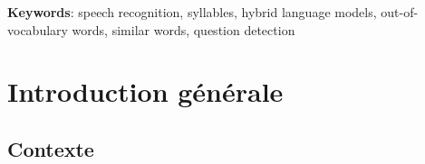 \documentclass{style/these}
\makeatletter
\newcommand\blankpage{%
    \null
    \thispagestyle{empty}%
    \addtocounter{page}{-1}%
    \newpage}
\renewcommand*{\cleardoublepage}{\clearpage\if@twoside \ifodd\c@page\else
	\hbox{}%
	\thispagestyle{empty}%
	\newpage%
	\if@twocolumn\hbox{}\newpage\fi\fi\fi}
\makeatother
\begin{document}
{\vspace{1.5ex}

\noindent\textbf{Keywords}: speech recognition, syllables, hybrid language models, out-of-vocabulary words, similar words, question detection
}

\cleardoublepage

\dominitoc
\doparttoc

\tableofcontents



\cleardoublepage
\begingroup
\makeatletter
\let\ps@plain\ps@empty
\makeatother

\pagestyle{empty}
{\small \listoffigures}
\cleardoublepage
\endgroup

\cleardoublepage
\begingroup
\makeatletter
\let\ps@plain\ps@empty
\makeatother

\pagestyle{empty}
{\small \listoftables}
\cleardoublepage
\endgroup



\mainmatter

\pagestyle{fancy}




{}

\chapter*{Introduction générale}
\renewcommand{\leftmark}{Introduction générale}

\minitoc

\section*{Contexte}
\renewcommand{\rightmark}{Contexte}
\end{document}
